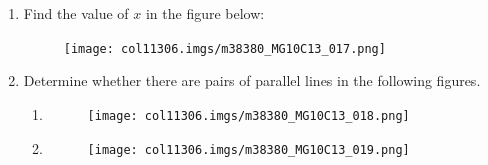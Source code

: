 \begin{table}[H]
\begin{enumerate}[noitemsep, label=\textbf{\arabic*}. ]
    \addtocounter{footnote}{-0}
\pagebreak
            \item Find the value of \begin{math}x\end{math} in the figure below:

    \setcounter{subfigure}{0}


	\begin{figure}[H] %
    \begin{center}
    \label{m38380*id317330!!!underscore!!!media}\label{m38380*id317330!!!underscore!!!printimage}\texttt{[image: col11306.imgs/m38380\_MG10C13\_017.png]} %
        
      \vspace{2pt}
    \vspace{.1in}
    
    \end{center}

 \end{figure}   

    \addtocounter{footnote}{-0}
            \item  Determine whether there are pairs of parallel lines in the following figures.
\label{m38380*id79123}\begin{enumerate}[noitemsep, label=\textbf{\alph*}. ] 
            \item 

    \setcounter{subfigure}{0}


	\begin{figure}[H] %
    \begin{center}
    \label{m38380*id317353!!!underscore!!!media}\label{m38380*id317353!!!underscore!!!printimage}\texttt{[image: col11306.imgs/m38380\_MG10C13\_018.png]} %
        
      \vspace{2pt}
    \vspace{.1in}
    
    \end{center}

 \end{figure}   

    \addtocounter{footnote}{-0}
    
\item 

    \setcounter{subfigure}{0}


	\begin{figure}[H] %
    \begin{center}
    \label{m38380*id317367!!!underscore!!!media}\label{m38380*id317367!!!underscore!!!printimage}\texttt{[image: col11306.imgs/m38380\_MG10C13\_019.png]} %
        

\end{center}
\end{figure}
\end{enumerate}
\end{enumerate}
\end{table}
